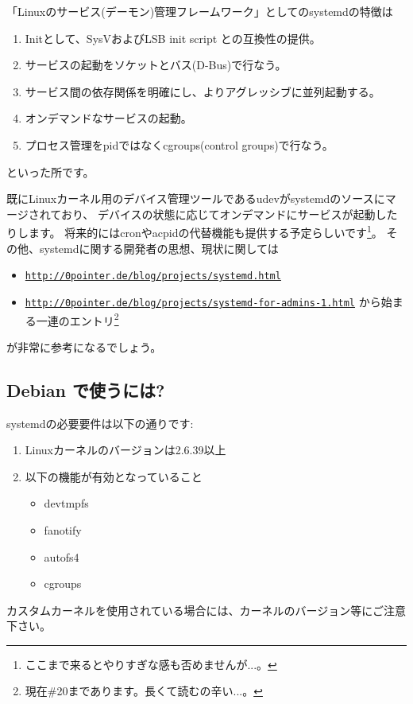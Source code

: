\documentclass[mingoth,a4paper]{jsarticle}
\begin{document}
「Linuxのサービス(デーモン)管理フレームワーク」としてのsystemdの特徴は
\begin{enumerate}[topsep=1zw]
\item Initとして、SysVおよびLSB init script との互換性の提供。
\item サービスの起動をソケットとバス(D-Bus)で行なう。
\item サービス間の依存関係を明確にし、よりアグレッシブに並列起動する。
\item オンデマンドなサービスの起動。
\item プロセス管理をpidではなくcgroups(control groups)で行なう。
\end{enumerate}
といった所です。

既にLinuxカーネル用のデバイス管理ツールであるudevがsystemdのソースにマージされており、
デバイスの状態に応じてオンデマンドにサービスが起動したりします。
将来的にはcronやacpidの代替機能も提供する予定らしいです\footnote{%
  ここまで来るとやりすぎな感も否めませんが...。
}。
その他、systemdに関する開発者の思想、現状に関しては
\begin{itemize}
\item %
  \href{http://0pointer.de/blog/projects/systemd.html}{\texttt{http://0pointer.de/blog/projects/systemd.html}}
\item %
  \href{http://0pointer.de/blog/projects/systemd-for-admins-1.html}{\texttt{http://0pointer.de/blog/projects/systemd-for-admins-1.html}}
  から始まる一連のエントリ\footnote{現在\#20まであります。長くて読むの辛い...。}
\end{itemize}
が非常に参考になるでしょう。

\subsection{Debian で使うには?}

systemdの必要要件は以下の通りです:
\begin{enumerate}[topsep=1zw]
\item Linuxカーネルのバージョンは2.6.39以上
\item 以下の機能が有効となっていること
  \begin{itemize}[topsep=0zw]
  \item devtmpfs
  \item fanotify
  \item autofs4
  \item cgroups
  \end{itemize}
\end{enumerate}
カスタムカーネルを使用されている場合には、カーネルのバージョン等にご注意下さい。
\end{document}
